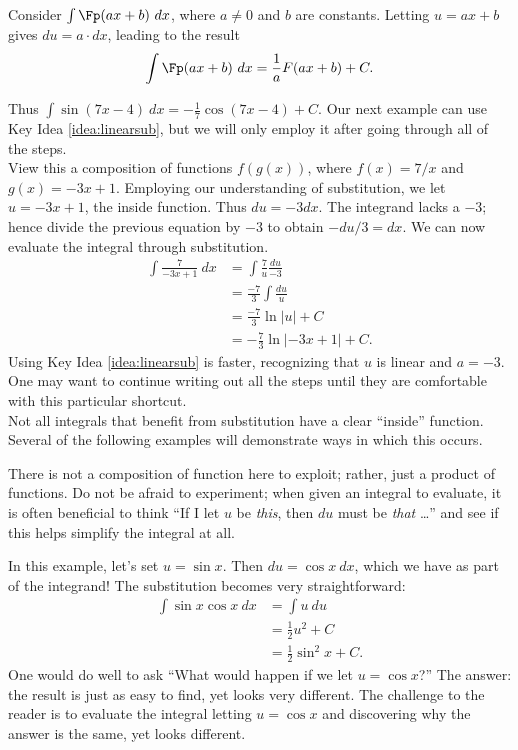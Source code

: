 {Consider $\int \Fp(ax+b)\ dx$, where $a\neq 0$ and $b$ are constants. Letting $u = ax+b$ gives $du = a\cdot dx$, leading to the result
$$\int \Fp(ax+b)\ dx = \frac{1}{a}F(ax+b) + C.$$
}

Thus $\int \sin (7x-4)\ dx = -\frac17\cos(7x-4)+C$. Our next example can use Key Idea \ref{idea:linearsub}, but we will only employ it after going through all of the steps.\\

{View this a composition of functions $f(g(x))$, where $f(x) = 7/x$ and $g(x) = -3x+1$. Employing our understanding of substitution, we let $u = -3x+1$, the inside function. Thus $du = -3dx$. The integrand lacks a $-3$; hence divide the previous equation by $-3$ to obtain $-du/3 = dx$. We can now evaluate the integral through substitution.
\begin{align*}
	\int \frac{7}{-3x+1}\ dx &=	\int \frac{7}{u}\frac{du}{-3} \\
												&= \frac{-7}3\int \frac{du}{u} \\
												&=	\frac{-7}3\ln |u| + C\\
												&=-\frac73\ln|-3x+1| + C.
\end{align*}
Using Key Idea \ref{idea:linearsub} is faster, recognizing that $u$ is linear and $a = -3$. One may want to continue writing out all the steps until they are comfortable with this particular shortcut.
}\\

Not all integrals that benefit from substitution have a clear ``inside'' function. Several of the following examples will demonstrate ways in which this occurs.\\

{There is not a composition of function here to exploit; rather, just a product of functions. Do not be afraid to experiment; when given an integral to evaluate, it is often beneficial to think ``If I let $u$ be \textit{this}, then $du$ must be \textit{that} \ldots'' and see if this helps simplify the integral at all.

In this example, let's set $u = \sin x$. Then $du = \cos x\ dx$, which we have as part of the integrand! The substitution becomes very straightforward:
		\begin{align*}
		\int \sin x\cos x\ dx &=	\int u\ du \\
											&= \frac12u^2+ C \\
											&= \frac12\sin^2 x + C.
		\end{align*}
One would do well to ask ``What would happen if we let $u = \cos x$?'' The answer: the result is just as easy to find, yet looks very different. The challenge to the reader is to evaluate the integral letting $u = \cos x$ and discovering why the answer is the same, yet looks different.
}\\

